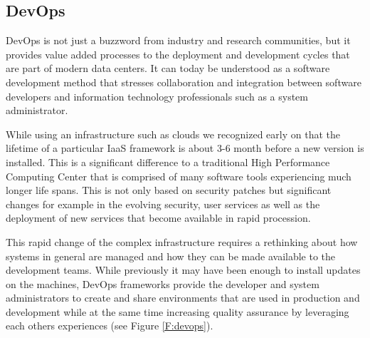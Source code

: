 \subsection{DevOps}

DevOps is not just a buzzword from industry and research communities,
but it provides value added processes to the deployment and
development cycles that are part of modern data centers. It can today
be understood as a software development method that stresses
collaboration and integration between software developers and
information technology professionals such as a system administrator. 

While using an infrastructure such as clouds we recognized early on
that the lifetime of a particular IaaS framework is about 3-6 month
before a new version is installed. This is a significant difference to
a traditional High Performance Computing Center that is comprised of
many software tools experiencing much longer life spans. This is not
only based on security patches but significant changes for example in
the evolving security, user services as well as the deployment of new
services that become available in rapid procession.

This rapid change of the complex infrastructure requires a rethinking
about how systems in general are managed and how they can be made
available to the development teams. While previously it may have been
enough to install updates on the machines, DevOps frameworks provide
the developer and system administrators to create and share
environments that are used in production and development while at the
same time increasing quality assurance by leveraging each others
experiences (see Figure \ref{F:devops}).

